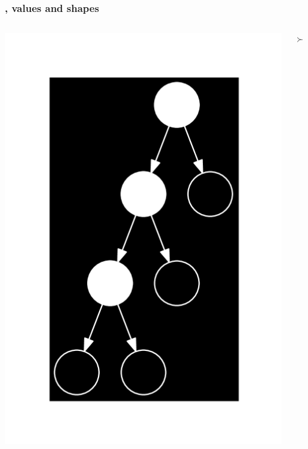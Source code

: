 \begin{frame}

\frametitle{\D{}, values and shapes}

\begin{columns}

\begin{center}
\includegraphics[scale=0.5]{figures/value}
\end{center}


\begin{center}
{\fontsize{40}{20}$\succ$}
\end{center}



\end{columns}
\end{frame}
